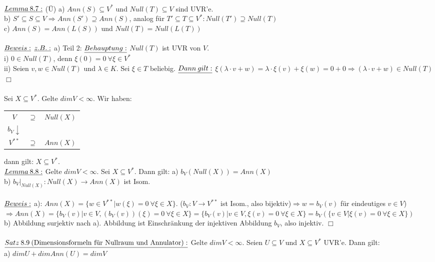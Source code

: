 \documentclass[fleqn, a4paper, 11pt]{article}
\begin{document}
\\
$\uline{Lemma\:8.7:}$ (\"U) a) $Ann(S)\subseteq V^{\ast}$ und $Null(T)\subseteq V$ sind UVR'e.\\
b) $S'\subseteq S\subseteq V\Rightarrow Ann(S')\supseteq Ann(S)$, analog f\"ur $T'\subseteq T\subseteq V^{\ast}:Null(T')\supseteq Null(T)$\\
c) $Ann(S)=Ann(L(S))$ und $Null(T)=Null(L(T))$\\
\\
$\uline{Beweis:}$ $\uline{z.B.:}$ a) Teil 2: $\uline{Behauptung:}$ $Null(T)$ ist UVR von $V$.\\
i) $0\in Null(T)$, denn $\xi(0)=0\:\forall\xi\in V^{\ast}$\\
ii) Seien $v,w\in Null(T)$ und $\lambda\in K$. Sei $\xi\in T$ beliebig. $\uline{Dann\:gilt:}$ $\xi(\lambda\cdot v+w)=\lambda\cdot\xi(v)+\xi(w)=0+0\Rightarrow (\lambda\cdot v+w)\in Null(T)$ \hfill $\Box$\\
\\
Sei $X\subseteq V^{\ast}$. Gelte $dim V<\infty$. Wir haben: \begin{tabular}{ccc}
	$V$ & $\supseteq$ & $Null(X)$\\
	$b_V \downarrow$ &&\\
	$V^{\ast\ast}$&$\supseteq$&$Ann(X)$
\end{tabular} dann gilt: $X\subseteq V^{\ast}$. 
\\
$\uline{Lemma\:8.8:}$ Gelte $dim V<\infty$. Sei $X\subseteq V^{\ast}$. Dann gilt: a) $b_V(Null(X))=Ann(X)$\\
b) $b_V|_{Null(X)}:Null(X)\rightarrow Ann(X)$ ist Isom.\\
\\
$\uline{Beweis:}$ a): $Ann(X)=\{w\in V^{\ast\ast}|w(\xi)=0\:\forall\xi\in X\}$. ($b_V:V\rightarrow V^{\ast\ast}$ ist Isom., also bijektiv)$\Rightarrow w=b_V(v)$ f\"ur eindeutiges $v\in V$)$\Rightarrow Ann(X)=\{b_V(v)|v\in V,(b_V(v))(\xi)=0\:\forall\xi\in X\}=\{b_V(v)|v\in V,\xi(v)=0\:\forall\xi\in X\}=b_V(\{v\in V|\xi(v)=0\:\forall\xi\in X\})$\\
b) Abbildung surjektiv nach a). Abbildung ist Einschr\"ankung der injektiven Abbildung $b_V$, also injektiv. \hfill $\Box$\\
\\
$\uline{Satz\:8.9\:(\text{Dimensionsformeln f\"ur Nullraum und Annulator}):}$ Gelte $dim V<\infty$. Seien $U\subseteq V$ und $X\subseteq V^{\ast}$ UVR'e. Dann gilt:\\
a) $dim U+dim Ann(U)=dim V$\\
\end{document}
